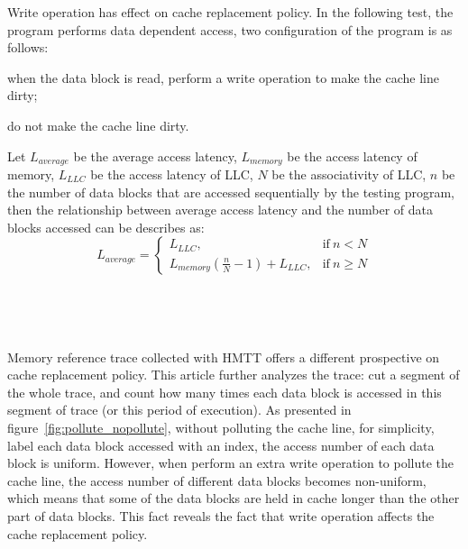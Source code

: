 \documentclass[conference]{IEEEtran}
\begin{document}
Write operation has effect on cache replacement policy. In the following test, the program performs data dependent access, two configuration of the program is as follows:
\begin{inparaenum}[(1)]
\item when the data block is read, perform a write operation to make the cache line dirty;
\item do not make the cache line dirty.
\end{inparaenum}

Let $L_{average}$ be the average access latency, $L_{memory}$ be the access latency of memory, $L_{LLC}$ be the access latency of LLC, $N$ be the associativity of LLC, $n$ be the number of data blocks that are accessed sequentially by the testing program, then the relationship between average access latency and the number of data blocks accessed can be describes as:
\begin{equation}   
	L_{average}=
      \begin{cases} 
	      L_{LLC}, & \text{if}\ n < N \\
	      L_{memory}(\frac{n}{N} - 1) + L_{LLC}, & \text{if}\ n \ge N 
      \end{cases}
      \label{Equ:slow}
\end{equation}
\begin{figure*}
\centering
	~
	~
	~
	~
	~

	~
	\caption{When test program performs data dependent access of different number of data blocks, the access number distribution of different data blocks in a period of time.}
	\label{fig:pollute_nopollute}
\end{figure*}
Memory reference trace collected with HMTT offers a different prospective on cache replacement policy. This article further analyzes the trace: cut a segment of the whole trace, and count how many times each data block is accessed in this segment of trace (or this period of execution). As presented in figure~\ref{fig:pollute_nopollute}, without polluting the cache line, for simplicity, label each data block accessed with an index, the access number of each data block is uniform. However, when perform an extra write operation to pollute the cache line, the access number of different data blocks becomes non-uniform, which means that some of the data blocks are held in cache longer than the other part of data blocks. This fact reveals the fact that write operation affects the cache replacement policy. 
\end{document}
